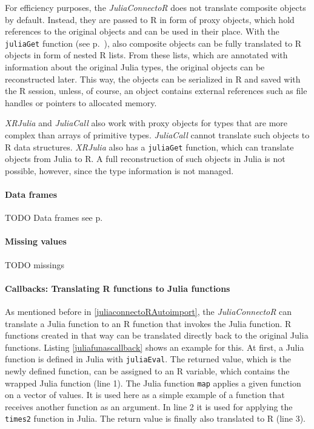 \documentclass[12pt]{article}
\newcommand{\inlinecode}[1]{\texttt{#1}}
\newcommand{\apkg}[1]{\emph{#1}}
\begin{document}
For efficiency purposes, the \apkg{JuliaConnectoR} does not translate composite objects by default.
Instead, they are passed to R in form of proxy objects, which hold references to the original objects and can be used in their place.
With the \inlinecode{juliaGet} function (see p.~\pageref{rdokitem_juliaGet}), also composite objects can be fully translated to R objects in form of nested R lists.
From these lists, which are annotated with information about the original Julia types, the original objects can be reconstructed later.
This way, the objects can be serialized in R and saved with the R session, unless, of course, an object contains external references such as file handles or pointers to allocated memory.

\apkg{XRJulia} and \apkg{JuliaCall} also work with proxy objects for types that are more complex than arrays of primitive types.
\apkg{JuliaCall} cannot translate such objects to R data structures.
\apkg{XRJulia} also has a \inlinecode{juliaGet} function, which can translate objects from Julia to R.
A full reconstruction of such objects in Julia is not possible, however, since the type information is not managed.


\paragraph{Data frames}\label{juliaconnectordataframes}
TODO Data frames
see p.~\pageref{rdokitem_as.data.frame.JuliaProxy}


\paragraph{Missing values}\label{juliaconnectorMissings}

TODO missings

\paragraph{Callbacks: Translating R functions to Julia functions}\label{juliaconnectorcallbacks}

As mentioned before in \ref{juliaconnectoRAutoimport}, the \apkg{JuliaConnectoR} can translate a Julia function to an R function that invokes the Julia function.
R functions created in that way can be translated directly back to the original Julia functions.
Listing \ref{juliafunascallback} shows an example for this.
At first, a Julia function is defined in Julia with \inlinecode{juliaEval}.
The returned value, which is the newly defined function, can be assigned to an R variable, which contains the wrapped Julia function (line 1).
The Julia function \inlinecode{map} applies a given function on a vector of values.
It is used here as a simple example of a function that receives another function as an argument.
In line 2 it is used for applying the \inlinecode{times2} function in Julia.
The return value is finally also translated to R (line 3). 
\end{document}
